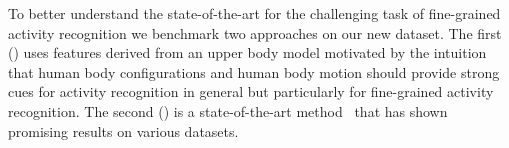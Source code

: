 To better understand the state-of-the-art for the challenging task of fine-grained activity recognition we benchmark two approaches on our new dataset. 
The first 
() uses features derived from an upper body model motivated by the intuition that human body configurations and human body motion should provide strong cues for activity recognition in general but particularly for fine-grained activity recognition. 
The second () is a state-of-the-art method~\citep{wang11cvpr,wang13ijcv} that has shown promising results on various datasets. 